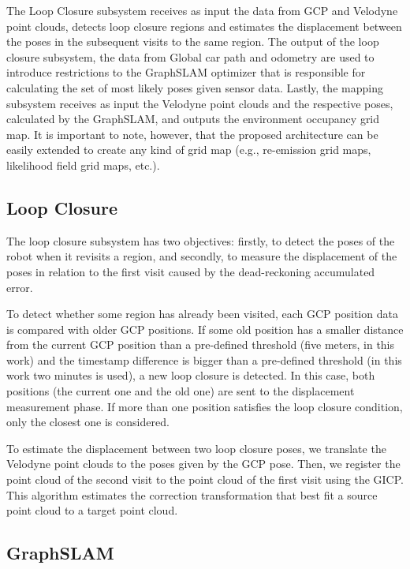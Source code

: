 The Loop Closure subsystem receives as input the data from GCP and Velodyne point clouds, detects loop closure regions and estimates the displacement between the poses in the subsequent visits to the same region. The output of the loop closure subsystem, the data from Global car path and odometry are used to introduce restrictions to the GraphSLAM optimizer that is responsible for calculating the set of most likely poses given sensor data. Lastly, the mapping subsystem receives as input the Velodyne point clouds and the respective poses, calculated by the GraphSLAM, and outputs the environment occupancy grid map. It is important to note, however, that the proposed architecture can be easily extended to create any kind of grid map (e.g., re-emission grid maps, likelihood field grid maps, etc.).


\subsection{Loop Closure}

The loop closure subsystem has two objectives: firstly, to detect the poses of the robot when it revisits a region, and secondly, to measure the displacement of the poses in relation to the first visit caused by the dead-reckoning accumulated error.

To detect whether some region has already been visited, each GCP position data is compared with older GCP positions. If some old position has a smaller distance from the current GCP position than a pre-defined threshold (five meters, in this work) and the timestamp difference is bigger than a pre-defined threshold (in this work two minutes is used), a new loop closure is detected. In this case, both positions (the current one and the old one) are sent to the displacement measurement phase. If more than one position satisfies the loop closure condition, only the closest one is considered.

To estimate the displacement between two loop closure poses, we translate the Velodyne point clouds to the poses given by the GCP pose. Then, we register the point cloud of the second visit to the point cloud of the first visit using the GICP. This algorithm estimates the correction transformation that best fit a source point cloud to a target point cloud.

\subsection{GraphSLAM}

